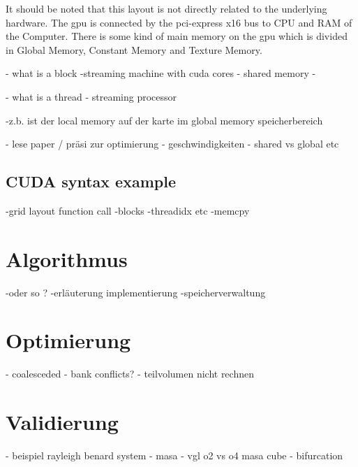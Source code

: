 It should be noted that this layout is not directly related to the underlying hardware.
The gpu is connected by the pci-express x16 bus to CPU and RAM of the Computer.
There is some kind of main memory on the gpu which is divided in Global Memory, Constant Memory and Texture Memory.

- what is a block
    -streaming machine with cuda cores
    - shared memory
    -

- what is a thread
- streaming processor


-z.b. ist der local memory auf der karte im global memory speicherbereich

- lese paper / präsi zur optimierung
- geschwindigkeiten
- shared vs global etc

\subsection{CUDA syntax example}

-grid layout function call
-blocks
-threadidx etc
-memcpy

\section{Algorithmus}
-oder so ?
-erläuterung  implementierung
-speicherverwaltung

\section{Optimierung}
- coalesceded
- bank conflicts?
- teilvolumen nicht rechnen

\section{Validierung}
- beispiel rayleigh benard system
- masa
- vgl o2 vs o4 masa cube
- bifurcation


\newpage

